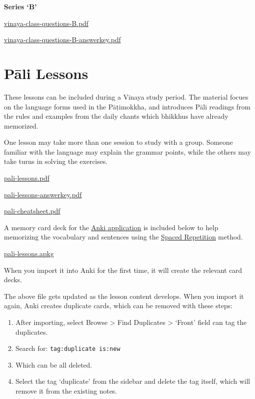 \textbf{Series `B'}

\href{./includes/docs/vinaya-class-questions-B.pdf}{vinaya-class-questions-B.pdf}

\href{./includes/docs/vinaya-class-questions-B-answerkey.pdf}{vinaya-class-questions-B-answerkey.pdf}

\section{Pāli Lessons}

These lessons can be included during a Vinaya study period. The material
focues on the language forms used in the Pāṭimokkha, and introduces Pāli
readings from the rules and examples from the daily chants which
bhikkhus have already memorized.

One lesson may take more than one session to study with a group. Someone
familiar with the language may explain the grammar points, while the
others may take turns in solving the exercises.

\href{./includes/docs/pali-lessons.pdf}{pali-lessons.pdf}

\href{./includes/docs/pali-lessons-answerkey.pdf}{pali-lessons-answerkey.pdf}

\href{./includes/docs/pali-cheatsheet.pdf}{pali-cheatsheet.pdf}

A memory card deck for the \href{https://apps.ankiweb.net/}{Anki
application} is included below to help memorizing the vocabulary and
sentences using the \href{https://gwern.net/spaced-repetition}{Spaced
Repetition} method.

\href{./includes/docs/pali-lessons.apkg}{pali-lessons.apkg}

When you import it into Anki for the first time, it will create the
relevant card decks.

The above file gets updated as the lesson content develops. When you
import it again, Anki creates duplicate cards, which can be removed with
these steps:

\begin{enumerate}
\def\labelenumi{\arabic{enumi}.}
\tightlist
\item
  After importing, select Browse \textgreater{} Find Duplicates
  \textgreater{} `Front' field can tag the duplicates.
\item
  Search for: \texttt{tag:duplicate\ is:new}
\item
  Which can be all deleted.
\item
  Select the tag `duplicate' from the sidebar and delete the tag itself,
  which will remove it from the existing notes.
\end{enumerate}

